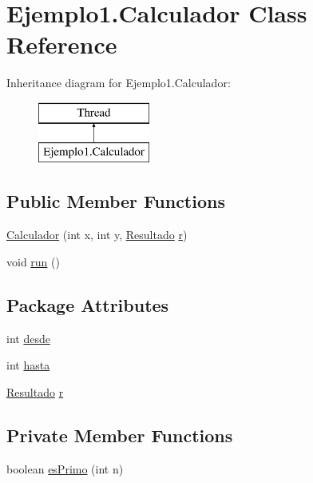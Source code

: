 \hypertarget{class_ejemplo1_1_1_calculador}{}\section{Ejemplo1.\+Calculador Class Reference}
\label{class_ejemplo1_1_1_calculador}
Inheritance diagram for Ejemplo1.\+Calculador\+:\begin{figure}[H]
\begin{center}
\leavevmode
\includegraphics[height=2.000000cm]{class_ejemplo1_1_1_calculador}
\end{center}
\end{figure}
\subsection*{Public Member Functions}
\begin{DoxyCompactItemize}
\item 
\mbox{\hyperlink{class_ejemplo1_1_1_calculador_a80cde3ae5440c9a6cec72fe788f08f0c}{Calculador}} (int x, int y, \mbox{\hyperlink{class_ejemplo1_1_1_resultado}{Resultado}} \mbox{\hyperlink{class_ejemplo1_1_1_calculador_a630ab3c94b10e8ca0483b6ca6a6dc380}{r}})
\item 
void \mbox{\hyperlink{class_ejemplo1_1_1_calculador_ae4be53c009236802d18046f14b93d739}{run}} ()
\end{DoxyCompactItemize}
\subsection*{Package Attributes}
\begin{DoxyCompactItemize}
\item 
int \mbox{\hyperlink{class_ejemplo1_1_1_calculador_ae2bd37cb102b858db503e8b30c8f4ae6}{desde}}
\item 
int \mbox{\hyperlink{class_ejemplo1_1_1_calculador_ad47ad2af292db2c559a379ecc3e15f73}{hasta}}
\item 
\mbox{\hyperlink{class_ejemplo1_1_1_resultado}{Resultado}} \mbox{\hyperlink{class_ejemplo1_1_1_calculador_a630ab3c94b10e8ca0483b6ca6a6dc380}{r}}
\end{DoxyCompactItemize}
\subsection*{Private Member Functions}
\begin{DoxyCompactItemize}
\item 
boolean \mbox{\hyperlink{class_ejemplo1_1_1_calculador_ad9ecfddfb2d7350e2b30ff9bdc4cc97d}{es\+Primo}} (int n)
\end{DoxyCompactItemize}



